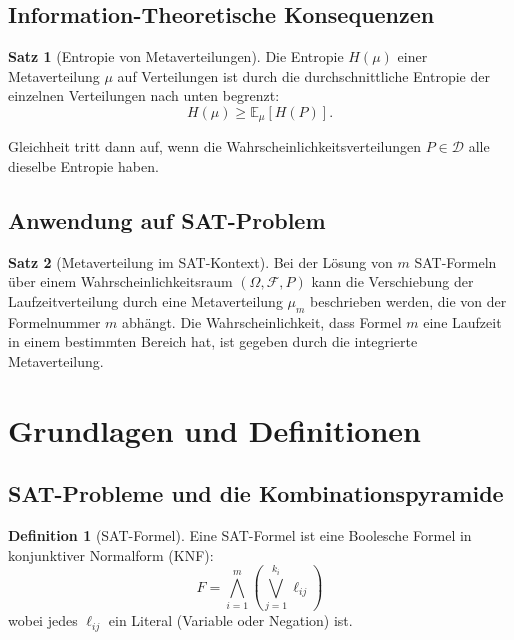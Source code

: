 ﻿\documentclass[a4paper,12pt]{article}
\theoremstyle{definition}
\newtheorem{definition}{Definition}
\newtheorem{satz}{Satz}
\begin{document}
\subsection{Information-Theoretische Konsequenzen}

\begin{satz}[Entropie von Metaverteilungen]
\label{satz:entropie-meta}
Die Entropie $H(\mu)$ einer Metaverteilung $\mu$ auf Verteilungen ist durch die durchschnittliche Entropie der einzelnen Verteilungen nach unten begrenzt:
\[
H(\mu) \geq \mathbb{E}_\mu[H(P)].
\]

Gleichheit tritt dann auf, wenn die Wahrscheinlichkeitsverteilungen $P \in \mathcal{D}$ alle dieselbe Entropie haben.
\end{satz}

\subsection{Anwendung auf SAT-Problem}

\begin{satz}[Metaverteilung im SAT-Kontext]
\label{satz:sat-metaverteilung}
Bei der Lösung von $m$ SAT-Formeln über einem Wahrscheinlichkeitsraum $(\Omega, \mathcal{F}, P)$ kann die Verschiebung der Laufzeitverteilung durch eine Metaverteilung $\mu_m$ beschrieben werden, die von der Formelnummer $m$ abhängt. Die Wahrscheinlichkeit, dass Formel $m$ eine Laufzeit in einem bestimmten Bereich hat, ist gegeben durch die integrierte Metaverteilung.
\end{satz}

\section{Grundlagen und Definitionen}

\subsection{SAT-Probleme und die Kombinationspyramide}

\begin{definition}[SAT-Formel]
Eine SAT-Formel ist eine Boolesche Formel in konjunktiver Normalform (KNF):
\[
F = \bigwedge_{i=1}^{m} \left( \bigvee_{j=1}^{k_i} \ell_{ij} \right)
\]
wobei jedes $\ell_{ij}$ ein Literal (Variable oder Negation) ist.
\end{definition}
\end{document}
